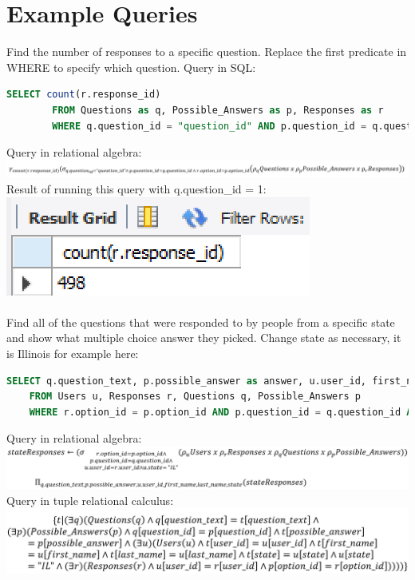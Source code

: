 \documentclass[12pt, oneside, a4paper]{article}
\begin{document}
    \section{Example Queries}
    Find the number of responses to a specific question. Replace the first predicate in WHERE to specify which question. Query in SQL:
    \begin{lstlisting}[language=SQL, columns=flexible, breaklines]
        SELECT count(r.response_id)
        FROM Questions as q, Possible_Answers as p, Responses as r
        WHERE q.question_id = "question_id" AND p.question_id = q.question_id AND r.option_id = p.option_id
    \end{lstlisting}
    Query in relational algebra:\\
    \includegraphics{responsecountqueryalgebra.PNG}
    Result of running this query with q.question\_id = 1:
    \includegraphics{responsecountquery.PNG}
    \\
    \\
    Find all of the questions that were responded to by people from a specific state and show what multiple choice answer they picked. Change state as necessary, it is Illinois for example here:
    \begin{lstlisting}[language=SQL, columns=flexible, breaklines]
    SELECT q.question_text, p.possible_answer as answer, u.user_id, first_name, last_name, state
    FROM Users u, Responses r, Questions q, Possible_Answers p
    WHERE r.option_id = p.option_id AND p.question_id = q.question_id AND u.user_id = r.user_id AND state = "IL";
    \end{lstlisting}
    Query in relational algebra: \\
    \includegraphics[scale=0.6]{questionstatequeryalgebra.PNG}
    Query in tuple relational calculus: \\
    \includegraphics[scale=0.7]{questionstatequerycalculus3.PNG}
\end{document}
